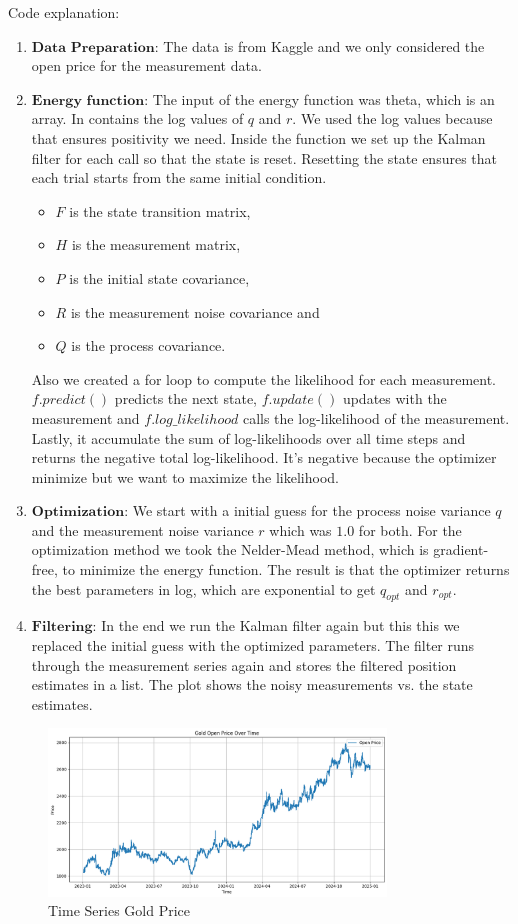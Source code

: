 Code explanation: 
\begin{enumerate}
    \item $\textbf{Data Preparation}$: The data is from Kaggle and we only considered the open price for the measurement data. 
    \item $\textbf{Energy function}$: The input of the energy function was theta, which is an array. In contains the log values of $q$ and $r$. We used the log values because that ensures positivity we need. Inside the function we set up the Kalman filter for each call so that the state is reset. Resetting the state ensures that each trial starts from the same initial condition.
    \begin{itemize}
        \item $F$ is the state transition matrix,
        \item $H$ is the measurement matrix,
        \item $P$ is the initial state covariance,
        \item $R$ is the measurement noise covariance and
        \item $Q$ is the process covariance.
    \end{itemize}
    Also we created a for loop to compute the likelihood for each measurement. $f.predict()$ predicts the next state, $f.update()$ updates with the measurement and $f.log\_likelihood$ calls the log-likelihood of the measurement. Lastly, it accumulate the sum of log-likelihoods over all time steps and returns the negative total log-likelihood. It's negative because the optimizer minimize but we want to maximize the likelihood.
    \item $\textbf{Optimization}$: We start with a initial guess for the process noise variance $q$ and the measurement noise variance $r$ which was $1.0$ for both. For the optimization method we took the Nelder-Mead method, which is gradient-free, to minimize the energy function. The result is that the optimizer returns the best parameters in log, which are exponential to get $q_{opt}$ and $r_{opt}$.
    \item $\textbf{Filtering}$: In the end we run the Kalman filter again but this this we replaced the initial guess with the optimized parameters. The filter runs through the measurement series again and stores the filtered position estimates in a list. The plot shows the noisy measurements vs. the state estimates. 
\end{enumerate}


\begin{figure}
    \centering
    \includegraphics[width=0.8\textwidth]{Figures/Time Series Gold Price.png}
    \caption{Time Series Gold Price}
    \label{fig:time_series_goldprice}
\end{figure}


